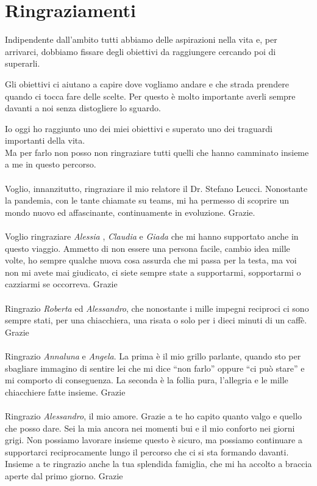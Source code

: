 \chapter*{Ringraziamenti}

Indipendente dall'ambito tutti abbiamo delle aspirazioni nella vita e, per arrivarci, dobbiamo fissare degli obiettivi da raggiungere cercando poi di superarli.

Gli obiettivi ci aiutano a capire dove vogliamo andare e che strada prendere quando ci tocca fare delle scelte. Per questo \`e molto importante averli sempre davanti a noi senza distogliere lo sguardo.

Io oggi ho raggiunto uno dei miei obiettivi e superato uno dei traguardi importanti della vita.\\
Ma per farlo non posso non ringraziare tutti quelli che hanno camminato insieme a me in questo percorso.
\\
\\
Voglio, innanzitutto, ringraziare il mio relatore il Dr. Stefano Leucci. %
Nonostante la pandemia, con le tante chiamate su teams, mi ha permesso di scoprire un mondo nuovo ed affascinante, continuamente in evoluzione. Grazie.
\\
\\
Voglio ringraziare \textit{Alessia} , \textit{Claudia} e \textit{Giada} che mi hanno supportato anche in questo viaggio. 
Ammetto di non essere una persona facile, cambio idea mille volte, ho sempre qualche nuova cosa assurda che mi passa per la testa, ma voi non mi avete mai giudicato, ci siete sempre state a supportarmi, sopportarmi o cazziarmi se occorreva. Grazie
\\
\\
Ringrazio \textit{Roberta} ed \textit{Alessandro}, che nonostante i mille impegni reciproci ci sono sempre stati, per una chiacchiera, una risata o solo per i dieci minuti di un caff\`e. Grazie
\\
\\
Ringrazio \textit{Annaluna} e \textit{Angela}. La prima \`e il mio grillo parlante, quando sto per sbagliare immagino di sentire lei che mi dice ``non farlo'' oppure ``ci pu\`o stare'' e mi comporto di conseguenza. La seconda \`e la follia pura, l'allegria e le mille chiacchiere fatte insieme. Grazie
\\
\\
Ringrazio \textit{ Alessandro}, il mio amore. Grazie a te ho capito quanto valgo e quello che posso dare.
Sei la mia ancora nei momenti bui e il mio conforto nei giorni grigi. Non possiamo lavorare insieme questo \`e sicuro, ma possiamo continuare a supportarci reciprocamente lungo il percorso che ci si sta formando davanti. Insieme a te ringrazio anche la tua splendida famiglia, che mi ha accolto a braccia aperte dal primo giorno. Grazie
